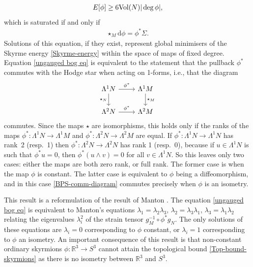 \documentclass[10pt,a4paper]{amsart}
\newcommand{\R}{{\mathbb{R}}}
\newcommand{\1}{{\mathbb{1}}}
\def \d{\mathrm{d}}
\numberwithin{equation}{section}
\begin{document}
\begin{align}
E[\phi]\geq 6{\rm Vol}(N)|\deg\phi|,\label{Top-bound-skyrmions}
\end{align}
which is saturated if and only if
\begin{align}\label{ungauged bog eq}
\star_{M} \d\phi = \phi^\ast \Sigma.
\end{align}
Solutions of this equation, if they exist, represent global minimisers of the Skyrme energy \eqref{Skyrme-energy} within the space of maps of fixed degree. Equation \eqref{ungauged bog eq} is equivalent to the statement that the pullback $\phi^\ast$ commutes with the Hodge star when acting on 1-forms, i.e., that the diagram
\begin{equation}\label{BPS-comm-diagram}
\begin{tikzcd}
\Lambda^1N\arrow{r}{\phi^\ast}\arrow[swap]{d}{\star_{N}}&\Lambda^1M\arrow{d}{\star_{M}}\\
\Lambda^2N\arrow{r}{\phi^\ast}&\Lambda^2M
\end{tikzcd}
\end{equation}
commutes. Since the maps $\star$ are isomorphisms, this holds only if the ranks of the maps $\phi^\ast\colon \Lambda^1N\to\Lambda^1M$ and $\phi^\ast\colon \Lambda^2N\to\Lambda^2M$ are equal. If $\phi^\ast\colon \Lambda^1N\to\Lambda^1N$ has rank~2 (resp.~1) then $\phi^\ast\colon \Lambda^2N\to\Lambda^2N$ has rank 1 (resp.\ 0), because if $u\in\Lambda^1N$ is such that $\phi^\ast u=0$, then $\phi^\ast(u\wedge v)=0$ for all $v\in\Lambda^1N$.
So this leaves only two cases: either the maps are both zero rank, or full rank. The former case is when the map $\phi$ is constant. The latter case is equivalent to $\phi$ being a diffeomorphism, and in this case \eqref{BPS-comm-diagram} commutes precisely when $\phi$ is an isometry.

This result is a reformulation of the result of Manton \cite{Manton1987geometry}. The equation \eqref{ungauged bog eq} is equivalent to Manton's equations $\lambda_1=\lambda_2\lambda_3$, $\lambda_2=\lambda_3\lambda_1$, $\lambda_3=\lambda_1\lambda_2$ relating the eigenvalues $\lambda_i^2$ of the strain tensor $g_M^{-1}\circ\phi^\ast g_N$. The only solutions of these equations are $\lambda_i=0$ corresponding to $\phi$ constant, or $\lambda_i=1$ corresponding to $\phi$ an isometry. An important consequence of this result is that non-constant ordinary skyrmions $\phi\colon \R^3\to S^3$ cannot attain the topological bound \eqref{Top-bound-skyrmions} as there is no isometry between $\R^3$ and $S^3$.
\end{document}
